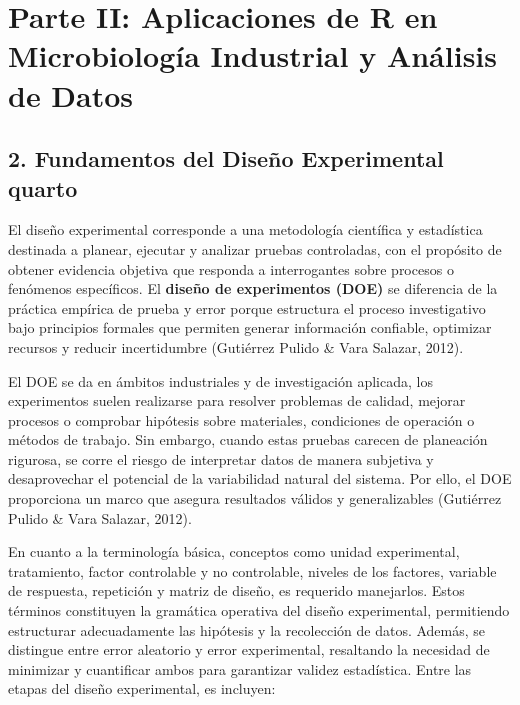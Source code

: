 \documentclass[
  spanish,
  letterpaper,
  DIV=11,
  numbers=noendperiod]{scrreprt}
\begin{document}

\chapter{Parte II: Aplicaciones de R en Microbiología Industrial y
Análisis de
Datos}\label{parte-ii-aplicaciones-de-r-en-microbiologuxeda-industrial-y-anuxe1lisis-de-datos}

\section{2. Fundamentos del Diseño Experimental
quarto}\label{fundamentos-del-diseuxf1o-experimental-quarto}

El diseño experimental corresponde a una metodología científica y
estadística destinada a planear, ejecutar y analizar pruebas
controladas, con el propósito de obtener evidencia objetiva que responda
a interrogantes sobre procesos o fenómenos específicos. El
\textbf{diseño de experimentos (DOE)} se diferencia de la práctica
empírica de prueba y error porque estructura el proceso investigativo
bajo principios formales que permiten generar información confiable,
optimizar recursos y reducir incertidumbre (Gutiérrez Pulido \& Vara
Salazar, 2012).

El DOE se da en ámbitos industriales y de investigación aplicada, los
experimentos suelen realizarse para resolver problemas de calidad,
mejorar procesos o comprobar hipótesis sobre materiales, condiciones de
operación o métodos de trabajo. Sin embargo, cuando estas pruebas
carecen de planeación rigurosa, se corre el riesgo de interpretar datos
de manera subjetiva y desaprovechar el potencial de la variabilidad
natural del sistema. Por ello, el DOE proporciona un marco que asegura
resultados válidos y generalizables (Gutiérrez Pulido \& Vara Salazar,
2012).

En cuanto a la terminología básica, conceptos como unidad experimental,
tratamiento, factor controlable y no controlable, niveles de los
factores, variable de respuesta, repetición y matriz de diseño, es
requerido manejarlos. Estos términos constituyen la gramática operativa
del diseño experimental, permitiendo estructurar adecuadamente las
hipótesis y la recolección de datos. Además, se distingue entre error
aleatorio y error experimental, resaltando la necesidad de minimizar y
cuantificar ambos para garantizar validez estadística. Entre las etapas
del diseño experimental, es incluyen:
\end{document}
